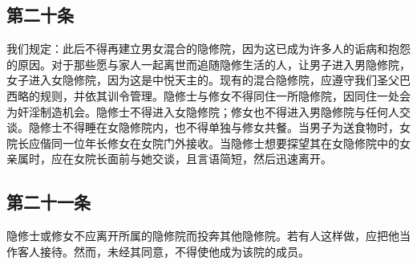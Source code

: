 \par


\subsection{第二十条}

\par

我们规定：此后不得再建立男女混合的隐修院，因为这已成为许多人的诟病和抱怨的原因。对于那些愿与家人一起离世而追随隐修生活的人，让男子进入男隐修院，女子进入女隐修院，因为这是中悦天主的。现有的混合隐修院，应遵守我们圣父巴西略的规则，并依其训令管理。隐修士与修女不得同住一所隐修院，因同住一处会为奸淫制造机会。隐修士不得进入女隐修院；修女也不得进入男隐修院与任何人交谈。隐修士不得睡在女隐修院内，也不得单独与修女共餐。当男子为送食物时，女院长应偕同一位年长修女在女院门外接收。当隐修士想要探望其在女隐修院中的女亲属时，应在女院长面前与她交谈，且言语简短，然后迅速离开。\par

\par


\subsection{第二十一条}

\par

隐修士或修女不应离开所属的隐修院而投奔其他隐修院。若有人这样做，应把他当作客人接待。然而，未经其同意，不得使他成为该院的成员。\par

\par

